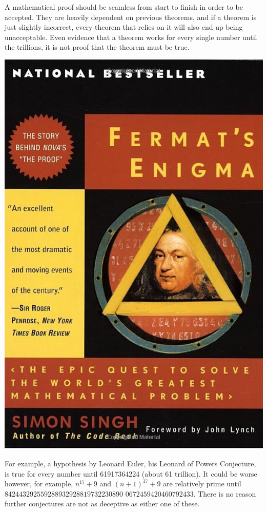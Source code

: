 \documentclass{article}
\begin{document}
 
A mathematical proof should be seamless from start to finish in order to be accepted. They are heavily dependent on previous theorems, and if a theorem is just slightly incorrect, every theorem that relies on it will also end up being unacceptable. Even evidence that a theorem works for every single number until the trillions, it is not proof that the theorem must be true.
\begin{center}
   \includegraphics{images/fermats_enigma.jpg}
\end{center}
For example, a hypothesis by Leonard Euler, his Leonard of Powers Conjecture, is true for every number until 61917364224 (about 61 trillion). It could be worse however, for example, $n^{17}+9$ and $(n+1)^{17} + 9$ are relatively prime until $842443292559288932928819732230890$
$0672459420460792433$. There is no reason further conjectures are not as deceptive as either one of these. 
\end{document}
